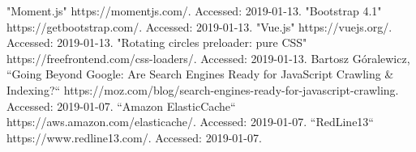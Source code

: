 \documentclass[conference]{IEEEtran}
\begin{document}
\begin{thebibliography}{00}
 "Moment.js" https://momentjs.com/. Accessed: 2019-01-13.
 "Bootstrap 4.1" https://getbootstrap.com/. Accessed: 2019-01-13.
 "Vue.js" https://vuejs.org/. Accessed: 2019-01-13.
 "Rotating circles preloader: pure CSS" https://freefrontend.com/css-loaders/. Accessed: 2019-01-13.
 Bartosz Góralewicz, “Going Beyond Google: Are Search Engines Ready for JavaScript Crawling \& Indexing?“ https://moz.com/blog/search-engines-ready-for-javascript-crawling. Accessed: 2019-01-07.
 “Amazon ElasticCache“ https://aws.amazon.com/elasticache/. Accessed: 2019-01-07.
 “RedLine13“ https://www.redline13.com/. Accessed: 2019-01-07.
\end{thebibliography}
\vspace{12pt}
\end{document}
